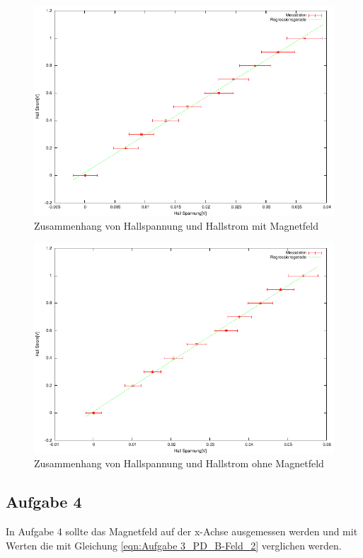 \documentclass[12pt]{scrartcl}
\begin{document}
\begin{figure}[htbp] 
  \centering
    \includegraphics[scale = 1.3]{aufgabe_3_e_m.pdf}
  	\caption[Zusammenhang von Hallspannung und Hallstrom mit Magnetfeld]{Zusammenhang von Hallspannung und Hallstrom mit Magnetfeld}
  \label{fig:kasten}
\end{figure}

\begin{figure}[htbp] 
  \centering
    \includegraphics[scale = 1.3]{aufgabe_3_e_o.pdf}
  	\caption[Zusammenhang von Hallspannung und Hallstrom ohne Magnetfeld]{Zusammenhang von Hallspannung und Hallstrom ohne Magnetfeld}
  \label{fig:kasten}
\end{figure}

\newpage

\subsection{Aufgabe 4}
In Aufgabe 4 sollte das Magnetfeld auf der x-Achse ausgemessen werden und mit Werten die mit Gleichung \ref{eqn:Aufgabe 3_PD_B-Feld_2} verglichen werden.
\end{document}
